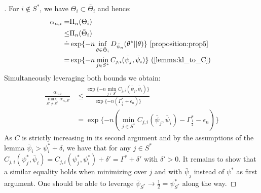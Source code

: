 \begin{proof}[]
  For $i \notin S^*$, we have $\Theta_i \subset \bar{\Theta}_i$ and hence:
  \begin{align}
    \alpha_{n,i} =& \Pi_n(\Theta_i) \\
    \leq& \Pi_n(\bar{\Theta}_i) \\
    \deq& \exp\{-n \inf_{\theta \in \bar{\Theta}_i}
        D_{\bar{\psi}_n}(\theta^*||\theta)\} \text{ \Cref{proposition:prop5}}\\
    =& \exp\{-n \min_{j \in S^*} C_{j, i}(\bar{\psi}_j, \bar{\psi}_i)\} \text{
        (\Cref{lemma:kl_to_C}) } \label{eq: only_i}
  \end{align}
  Simultaneously leveraging both bounds we obtain:
  \begin{align}
    \frac{\alpha_{n, i}}{\max_{S' \neq S^*} \alpha_{n, S'}} &\leq \frac{\exp\{-
        n \min_{j \in S^*} C_{j, i}(\bar{\psi}_j, \bar{\psi}_i)\}}{ \exp\{-n
        (\Gamma^*_{\frac{1}{2}} + \epsilon_n)\}} \\
    &= \exp\{-n( \min_{j \in S^*} C_{j, i}(\bar{\psi}_j, \bar{\psi}_i) -
        \Gamma^*_{\frac{1}{2}} - \epsilon_n) \}
  \end{align}
  As $C$ is strictly increasing in its second argument and by the assumptions of
  the lemma $\bar{\psi}_i > \psi_i^* + \delta$, we have that for any $j \in S^*$
  $C_{j, i}(\psi_j^*, \bar{\psi}_i) = C_{j, i}(\psi_j^*, \psi_i^*) + \delta' =
  \Gamma^* + \delta'$ with $\delta' > 0$. It remains to show that a similar
  equality holds when minimizing over $j$ and with $\bar{\psi}_j$ instead of
  $\psi^*$ as first argument. One should be able to leverage $\bar{\psi}_{S^*}
  \rightarrow \frac{1}{2} = \psi_{S^*}^*$ along the way.
\end{proof}

